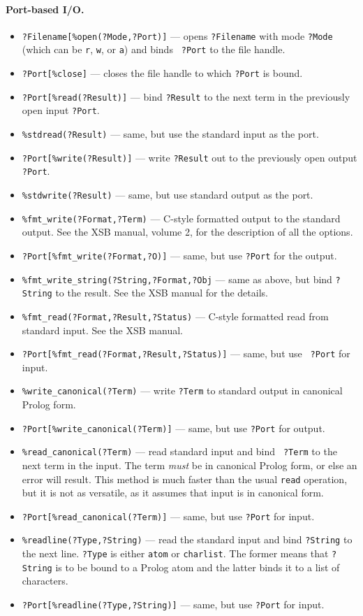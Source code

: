\documentclass[11pt]{article}
\begin{document}
\paragraph{Port-based I/O.}
\begin{itemize}
\item  {\tt ?Filename[\%open(?Mode,?Port)]} --- opens {\tt ?Filename} with mode
  {\tt ?Mode} (which can be {\tt r}, {\tt w}, or {\tt a}) and binds {\tt
  ?Port} to the file handle.
\item {\tt ?Port[\%close]} --- closes the file handle to which {\tt ?Port} is
  bound.
\item {\tt ?Port[\%read(?Result)]} --- bind {\tt ?Result} to the next term
  in the previously open input {\tt ?Port}.
\item {\tt \verb|%|stdread(?Result)} --- same, but use the standard input as the port.
\item {\tt ?Port[\%write(?Result)]} --- write {\tt ?Result} out to the
  previously open output {\tt ?Port}.
\item {\tt \verb|%|stdwrite(?Result)} --- same, but use standard output as the port.
\item {\tt \verb|%|fmt\_write(?Format,?Term)} --- C-style formatted output to the
  standard output. See the XSB manual, volume 2, for the description of all
  the options.
\item {\tt ?Port[\%fmt\_write(?Format,?O)]} --- same, but use {\tt ?Port} for the
  output. 
\item {\tt \verb|%|fmt\_write\_string(?String,?Format,?Obj} --- same as above, but bind
  {\tt ?String} to the result. See the XSB manual for the details.
\item {\tt \verb|%|fmt\_read(?Format,?Result,?Status)} --- C-style formatted read from
  standard input. See the XSB manual.
\item {\tt ?Port[\%fmt\_read(?Format,?Result,?Status)]}  ---  same, but use {\tt
    ?Port} for input.
\item {\tt \verb|%|write\_canonical(?Term)} --- write {\tt ?Term} to standard output
  in canonical Prolog form.
\item {\tt ?Port[\%write\_canonical(?Term)]} --- same, but use {\tt ?Port} for
  output.
\item {\tt \verb|%|read\_canonical(?Term)} --- read standard input and bind {\tt
    ?Term} to the next term in the input. The term \emph{must} be in
  canonical Prolog form, or else an error will result. This method is much
  faster than the usual {\tt read} operation, but it is not as versatile,
  as it assumes that input is in canonical form.
\item {\tt ?Port[\%read\_canonical(?Term)]} --- same, but use {\tt ?Port} for
  input.
\item {\tt \verb|%|readline(?Type,?String)} --- read the standard input and bind
  {\tt ?String} to the next line. {\tt ?Type} is either {\tt atom} or
  {\tt charlist}. The former means that {\tt ?String} is to be bound to a
  Prolog atom and the latter binds it to a list of characters.
\item {\tt ?Port[\%readline(?Type,?String)]} --- same, but use {\tt ?Port} for
  input.
\end{itemize}
\end{document}
